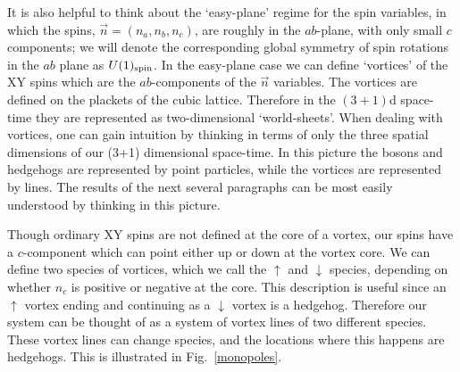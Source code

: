 \documentclass[prb,twocolumn]{revtex4-1}
\begin{document}
\begin{figure}
\label{heisbulk}
\end{figure}


It is also helpful to think about the `easy-plane' regime for the spin variables, in which the spins, $\vec{n} = (n_a, n_b, n_c)$, are roughly in the $ab$-plane, with only small $c$ components; we will denote the corresponding global symmetry of spin rotations in the $ab$ plane as $U(1)_{\rm spin}$. In the easy-plane case we can define `vortices' of the XY spins which are the $ab$-components of the $\vec n$ variables. The vortices are defined on the plackets of the cubic lattice. Therefore in the $(3+1)$d space-time they are represented as two-dimensional `world-sheets'. When dealing with vortices, one can gain intuition by thinking in terms of only the three spatial dimensions of our (3+1) dimensional space-time. In this picture the bosons and hedgehogs are represented by point particles, while the vortices are represented by lines. The results of the next several paragraphs can be most easily understood by thinking in this picture.

Though ordinary XY spins are not defined at the core of a vortex, our spins have a $c$-component which can point either up or down at the vortex core. We can define two species of vortices, which we call the $\uparrow$ and $\downarrow$ species, depending on whether $n_c$ is positive or negative at the core. This description is useful since an $\uparrow$ vortex ending and continuing as a $\downarrow$ vortex is a hedgehog. Therefore our system can be thought of as a system of vortex lines of two different species. These vortex lines can change species, and the locations where this happens are hedgehogs. This is illustrated in Fig.~\ref{monopoles}.

\end{document}
